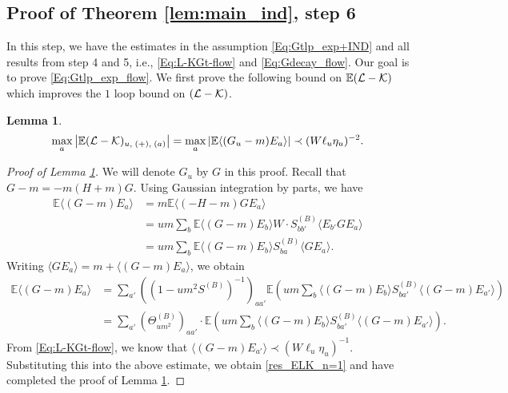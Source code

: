 \documentclass[10pt,reqno]{article}
\theoremstyle{plain} %
\newtheorem{lemma}[theorem]{Lemma}
\theoremstyle{remark}
\numberwithin{equation}{section}
\begin{document}
 \subsection{Proof of Theorem \ref{lem:main_ind}, step 6}\label{sec:step6E}
In this step, we have the estimates in the assumption \eqref{Eq:Gtlp_exp+IND} and all  results from step 4 and 5, i.e., \eqref{Eq:L-KGt-flow} and \eqref{Eq:Gdecay_flow}. Our goal is to prove \eqref{Eq:Gtlp_exp_flow}. 
We first  prove the following bound on   $\mathbb E{(\cal L-\cal K)}$ which improves the $1$ loop bound on  ${(\cal L-\cal K)}$.
\begin{lemma}\label{lem_ELK_n=1}
  \begin{align}\label{res_ELK_n=1}
  \max_a \left|\mathbb E({\cal L-\cal K})_{u, \;(+),\; (a)} \right|=  \max_a  \left|\mathbb E\langle (G_u-m) E_a\rangle\right|
  \prec (W\ell_u\eta_u)^{-2}  .
  \end{align} 
\end{lemma}
\begin{proof}[Proof of Lemma \ref{lem_ELK_n=1}]
We will denote $G_u$ by $G$ in this proof.  
Recall that $G - m = -m(H + m)G$. Using Gaussian integration by parts, we have  
\begin{align}
    \mathbb{E} \langle (G - m) E_a \rangle &= m \mathbb{E} \langle (-H - m) G E_a \rangle \nonumber \\
    &= u m \sum_b \mathbb{E} \langle (G - m) E_b \rangle W \cdot S^{(B)}_{bb'} \langle E_{b'} G E_a \rangle \nonumber \\
    &= u m \sum_b \mathbb{E} \langle (G - m) E_b \rangle S^{(B)}_{ba} \langle G E_a \rangle.
\end{align}
Writing $\langle G E_a \rangle = m + \langle (G - m) E_a \rangle$, we obtain  
\begin{align}
    \mathbb{E} \langle (G - m) E_a \rangle 
    &= \sum_{a'} \left((1 - um^2 S^{(B)})^{-1}\right)_{aa'} \mathbb{E} \left( um \sum_b \langle (G - m) E_b \rangle S^{(B)}_{ba'} \langle (G - m) E_{a'} \rangle \right) \nonumber \\
    &= \sum_{a'} \left(\Theta^{(B)}_{um^2}\right)_{aa'} \cdot \mathbb{E} \left( um \sum_b \langle (G - m) E_b \rangle S^{(B)}_{ba'} \langle (G - m) E_{a'} \rangle \right).
\end{align}
From \eqref{Eq:L-KGt-flow}, we know that $\langle (G - m) E_{a'} \rangle \prec (W \ell_u \eta_u)^{-1}$. Substituting this into the above estimate, we obtain \eqref{res_ELK_n=1} and  have completed the proof of Lemma \ref{lem_ELK_n=1}.
\end{proof}
\end{document}
